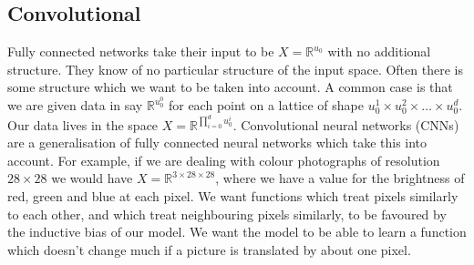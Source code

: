 \subsection{Convolutional}
Fully connected networks take their input to be $X=\mathbb{R}^{u_0}$ with no additional structure.
They know of no particular structure of the input space.
Often there is some structure which we want to be taken into account.
A common case is that we are given data in say $\mathbb{R}^{u_0^0}$ for each point on a lattice of shape $u_0^1\times u_0^2\times\dots\times u_0^d$.
Our data lives in the space $X=\mathbb{R}^{\prod_{i=0}^du_0^i}$.
Convolutional neural networks (CNNs) are a generalisation of fully connected neural networks which take this into account.
For example, if we are dealing with colour photographs of resolution $28\times28$ we would have $X=\mathbb{R}^{3\times28\times28}$, where we have a value for the brightness of red, green and blue at each pixel.
We want functions which treat pixels similarly to each other, and which treat neighbouring pixels similarly, to be favoured by the inductive bias of our model.
We want the model to be able to learn a function which doesn't change much if a picture is translated by about one pixel.

